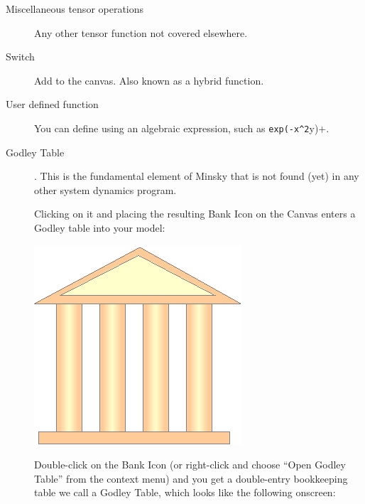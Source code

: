 \begin{description}
\item[Miscellaneous tensor operations]
  Any other tensor function not covered elsewhere.

\item[Switch]  Add  
to the canvas. Also known as a hybrid function.

\item[User defined function] You can
  define  using an algebraic expression, such as \verb+exp(-x^2+y)+.

\item[Godley Table] . \label{GodleyTable} This is the
fundamental element of Minsky that is not found (yet) in any other
system dynamics program. 

Clicking on it and placing the resulting Bank Icon on the Canvas
enters a Godley table into your model:

\begin{center}
\includegraphics{images/NewItem29.eps}
\end{center}

Double-click on the Bank Icon (or right-click and choose ``Open Godley
Table'' from the context menu) and you get a double-entry bookkeeping
table we call a Godley Table, which looks like the following onscreen:

\begin{center}
\end{center}


\end{description}
